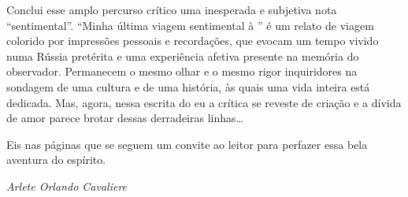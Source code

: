 Conclui esse amplo percurso crítico uma inesperada e subjetiva nota
``sentimental''. ``Minha última viagem sentimental à '' é um relato
de viagem colorido por impressões pessoais e recordações, que evocam um
tempo vivido numa Rússia pretérita e uma experiência afetiva presente na
memória do observador. Permanecem o mesmo olhar e o mesmo rigor
inquiridores na sondagem de uma cultura e de uma história, às quais uma
vida inteira está dedicada. Mas, agora, nessa escrita do eu a crítica se
reveste de criação e a dívida de amor parece brotar dessas derradeiras
linhas\ldots{}

Eis nas páginas que se seguem um convite ao leitor para perfazer essa
bela aventura do espírito.

\begin{flushright}
\emph{Arlete Orlando Cavaliere}
\end{flushright}



